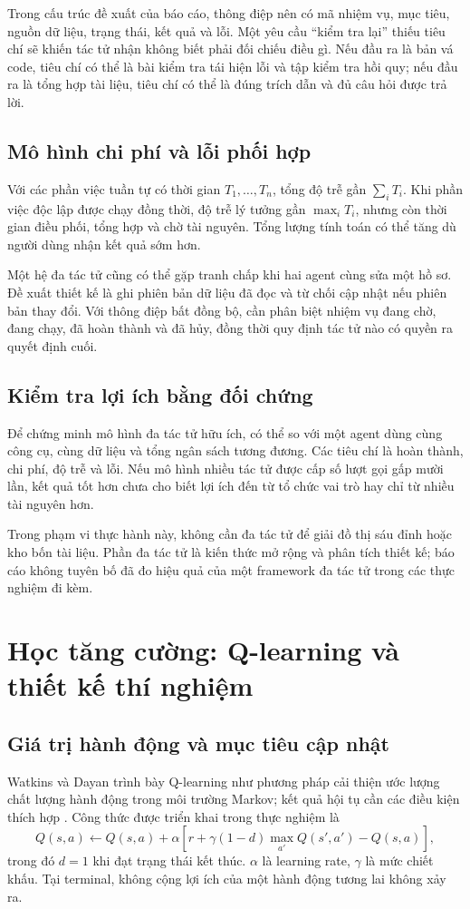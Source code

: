 Trong cấu trúc đề xuất của báo cáo, thông điệp nên có mã nhiệm vụ, mục tiêu, nguồn dữ
liệu, trạng thái, kết quả và lỗi. Một yêu cầu ``kiểm tra lại'' thiếu tiêu chí sẽ khiến
tác tử nhận không biết phải đối chiếu điều gì. Nếu đầu ra là bản vá code, tiêu chí có
thể là bài kiểm tra tái hiện lỗi và tập kiểm tra hồi quy; nếu đầu ra là tổng hợp tài
liệu, tiêu chí có thể là đúng trích dẫn và đủ câu hỏi được trả lời.

\subsection{Mô hình chi phí và lỗi phối hợp}
Với các phần việc tuần tự có thời gian $T_1,\dots,T_n$, tổng độ trễ gần
$\sum_i T_i$. Khi phần việc độc lập được chạy đồng thời, độ trễ lý tưởng gần
$\max_i T_i$, nhưng còn thời gian điều phối, tổng hợp và chờ tài nguyên. Tổng lượng
tính toán có thể tăng dù người dùng nhận kết quả sớm hơn.

Một hệ đa tác tử cũng có thể gặp tranh chấp khi hai agent cùng sửa một hồ sơ. Đề xuất
thiết kế là ghi phiên bản dữ liệu đã đọc và từ chối cập nhật nếu phiên bản thay đổi.
Với thông điệp bất đồng bộ, cần phân biệt nhiệm vụ đang chờ, đang chạy, đã hoàn thành
và đã hủy, đồng thời quy định tác tử nào có quyền ra quyết định cuối.

\subsection{Kiểm tra lợi ích bằng đối chứng}
Để chứng minh mô hình đa tác tử hữu ích, có thể so với một agent dùng cùng công cụ,
cùng dữ liệu và tổng ngân sách tương đương. Các tiêu chí là hoàn thành, chi phí,
độ trễ và lỗi. Nếu mô hình nhiều tác tử được cấp số lượt gọi gấp mười lần, kết quả
tốt hơn chưa cho biết lợi ích đến từ tổ chức vai trò hay chỉ từ nhiều tài nguyên hơn.

Trong phạm vi thực hành này, không cần đa tác tử để giải đồ thị sáu đỉnh hoặc kho bốn
tài liệu. Phần đa tác tử là kiến thức mở rộng và phân tích thiết kế; báo cáo không
tuyên bố đã đo hiệu quả của một framework đa tác tử trong các thực nghiệm đi kèm.

\par
\section{Học tăng cường: Q-learning và thiết kế thí nghiệm}
\subsection{Giá trị hành động và mục tiêu cập nhật}
Watkins và Dayan trình bày Q-learning như phương pháp cải thiện ước lượng chất lượng
hành động trong môi trường Markov; kết quả hội tụ cần các điều kiện thích hợp
\cite{qlearning}. Công thức được triển khai trong thực nghiệm là
\[
Q(s,a)\leftarrow Q(s,a)+\alpha\left[r+\gamma(1-d)\max_{a'}Q(s',a')-Q(s,a)\right],
\]
trong đó $d=1$ khi đạt trạng thái kết thúc. $\alpha$ là learning rate, $\gamma$ là mức
chiết khấu. Tại terminal, không cộng lợi ích của một hành động tương lai không xảy ra.


